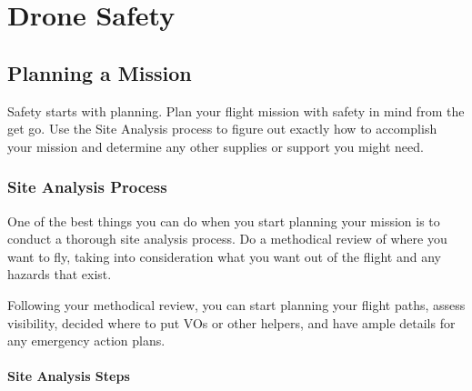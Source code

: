 \documentclass[
]{book}
\begin{document}
\hypertarget{part-drone-safety}{%
\part{Drone Safety}\label{part-drone-safety}}

\hypertarget{ch-mission}{%
\chapter{Planning a Mission}\label{ch-mission}}

Safety starts with planning. Plan your flight mission with safety in mind from the get go. Use the Site Analysis process to figure out exactly how to accomplish your mission and determine any other supplies or support you might need.

\hypertarget{site-analysis-process}{%
\section{Site Analysis Process}\label{site-analysis-process}}

One of the best things you can do when you start planning your mission is to conduct a thorough site analysis process. Do a methodical review of where you want to fly, taking into consideration what you want out of the flight and any hazards that exist.

Following your methodical review, you can start planning your flight paths, assess visibility, decided where to put VOs or other helpers, and have ample details for any emergency action plans.

\hypertarget{site-analysis-steps}{%
\subsection{Site Analysis Steps}\label{site-analysis-steps}}
\end{document}
